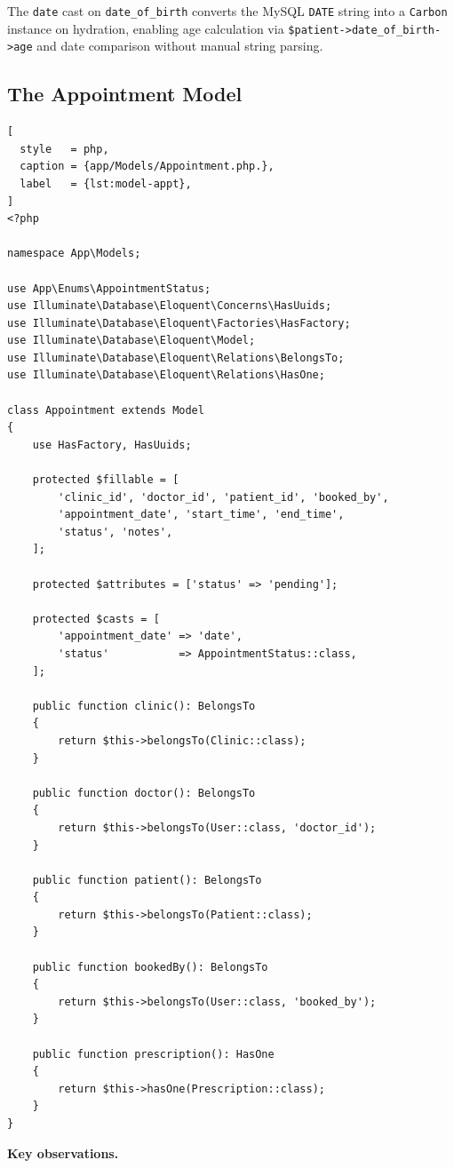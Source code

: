The \texttt{date} cast on \texttt{date\_of\_birth} converts the MySQL
\texttt{DATE} string into a \texttt{Carbon} instance on hydration,
enabling age calculation via \texttt{\$patient->date\_of\_birth->age}
and date comparison without manual string parsing.

\subsection{The Appointment Model}

\begin{lstlisting}[
  style   = php,
  caption = {app/Models/Appointment.php.},
  label   = {lst:model-appt},
]
<?php

namespace App\Models;

use App\Enums\AppointmentStatus;
use Illuminate\Database\Eloquent\Concerns\HasUuids;
use Illuminate\Database\Eloquent\Factories\HasFactory;
use Illuminate\Database\Eloquent\Model;
use Illuminate\Database\Eloquent\Relations\BelongsTo;
use Illuminate\Database\Eloquent\Relations\HasOne;

class Appointment extends Model
{
    use HasFactory, HasUuids;

    protected $fillable = [
        'clinic_id', 'doctor_id', 'patient_id', 'booked_by',
        'appointment_date', 'start_time', 'end_time',
        'status', 'notes',
    ];

    protected $attributes = ['status' => 'pending'];

    protected $casts = [
        'appointment_date' => 'date',
        'status'           => AppointmentStatus::class,
    ];

    public function clinic(): BelongsTo
    {
        return $this->belongsTo(Clinic::class);
    }

    public function doctor(): BelongsTo
    {
        return $this->belongsTo(User::class, 'doctor_id');
    }

    public function patient(): BelongsTo
    {
        return $this->belongsTo(Patient::class);
    }

    public function bookedBy(): BelongsTo
    {
        return $this->belongsTo(User::class, 'booked_by');
    }

    public function prescription(): HasOne
    {
        return $this->hasOne(Prescription::class);
    }
}
\end{lstlisting}

\textbf{Key observations.}

